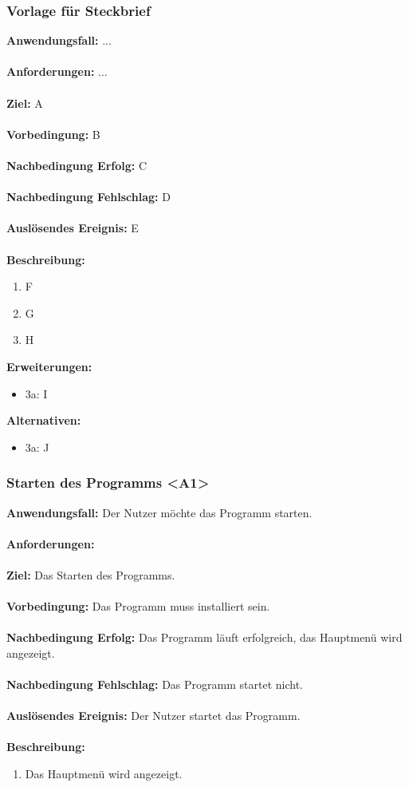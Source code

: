 \documentclass[parskip=full]{scrartcl} %
\begin{document}
\subsubsection*{Vorlage für Steckbrief}
\textbf{Anwendungsfall:} ...\\\\
\textbf{Anforderungen:} ...\\\\
\textbf{Ziel:} A \\\\
\textbf{Vorbedingung:} B \\\\
\textbf{Nachbedingung Erfolg:} C \\\\
\textbf{Nachbedingung Fehlschlag:} D \\\\
\textbf{Auslösendes Ereignis:} E \\\\
\textbf{Beschreibung:}
\begin{enumerate}
    \item F
    \item G
    \item H
\end{enumerate}
\textbf{Erweiterungen:} 
\begin{itemize}
    \item 3a: I
\end{itemize}
\textbf{Alternativen:} 
\begin{itemize}
    \item 3a: J
\end{itemize}
\newpage


\subsubsection*{Starten des Programms <A1>}
\textbf{Anwendungsfall:}  Der Nutzer möchte das Programm starten.\\\\
\textbf{Anforderungen:} \\\\
\textbf{Ziel:} Das Starten des Programms. \\\\
\textbf{Vorbedingung:} Das Programm muss installiert sein.  \\\\
\textbf{Nachbedingung Erfolg:} Das Programm läuft erfolgreich, das Hauptmenü wird angezeigt.\\\\
\textbf{Nachbedingung Fehlschlag:} Das Programm startet nicht. \\\\
\textbf{Auslösendes Ereignis:} Der Nutzer startet das Programm. \\\\
\textbf{Beschreibung:}
\begin{enumerate}
    \item Das Hauptmenü wird angezeigt.
\end{enumerate}
\newpage
\end{document}
